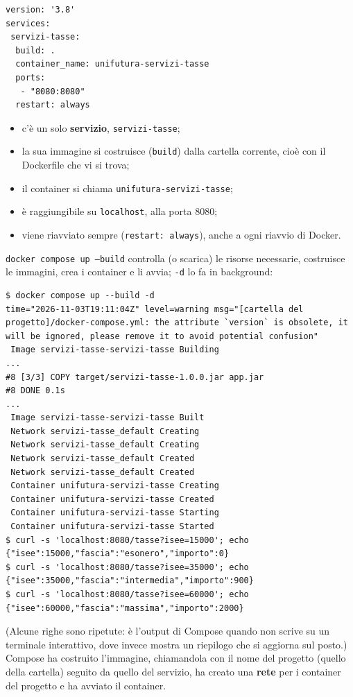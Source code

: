 \begin{lstlisting}[style=yaml, name=servizi-tasse/docker-compose.yml]
version: '3.8'
services:
 servizi-tasse:
  build: .
  container_name: unifutura-servizi-tasse
  ports:
   - "8080:8080"
  restart: always
\end{lstlisting}

\begin{itemize}
  \item c'è un solo \textbf{servizio}, \texttt{servizi-tasse};
  \item la sua immagine si costruisce (\texttt{build}) dalla cartella corrente, cioè con il Dockerfile che vi si trova;
  \item il container si chiama \texttt{unifutura-servizi-tasse};
  \item è raggiungibile su \texttt{localhost}, alla porta 8080;
  \item viene riavviato sempre (\texttt{restart: always}), anche a ogni riavvio di Docker.
\end{itemize}

\texttt{docker compose up --build} controlla (o scarica) le risorse necessarie, costruisce le immagini, crea i
container e li avvia; \texttt{-d} lo fa in background:

\begin{lstlisting}[style=shell, name=Terminale]
$ docker compose up --build -d
time="2026-11-03T19:11:04Z" level=warning msg="[cartella del progetto]/docker-compose.yml: the attribute `version` is obsolete, it will be ignored, please remove it to avoid potential confusion"
 Image servizi-tasse-servizi-tasse Building
...
#8 [3/3] COPY target/servizi-tasse-1.0.0.jar app.jar
#8 DONE 0.1s
...
 Image servizi-tasse-servizi-tasse Built
 Network servizi-tasse_default Creating
 Network servizi-tasse_default Creating
 Network servizi-tasse_default Created
 Network servizi-tasse_default Created
 Container unifutura-servizi-tasse Creating
 Container unifutura-servizi-tasse Created
 Container unifutura-servizi-tasse Starting
 Container unifutura-servizi-tasse Started
$ curl -s 'localhost:8080/tasse?isee=15000'; echo
{"isee":15000,"fascia":"esonero","importo":0}
$ curl -s 'localhost:8080/tasse?isee=35000'; echo
{"isee":35000,"fascia":"intermedia","importo":900}
$ curl -s 'localhost:8080/tasse?isee=60000'; echo
{"isee":60000,"fascia":"massima","importo":2000}
\end{lstlisting}

(Alcune righe sono ripetute: è l'output di Compose quando non scrive su un terminale interattivo, dove invece mostra un
riepilogo che si aggiorna sul posto.) Compose ha costruito l'immagine, chiamandola con il nome del progetto (quello della cartella)
seguito da quello del servizio, ha creato una \textbf{rete} per i container del progetto e ha avviato il container.

